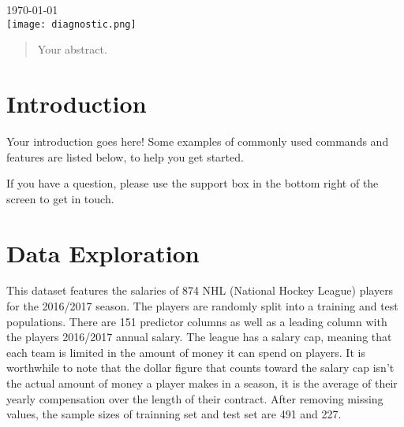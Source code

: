 \begin{titlepage}

{\large \today}\\[2cm] %


\texttt{[image: diagnostic.png]}\\[1cm] %
 

\vfill %

\end{titlepage}


\begin{abstract}
Your abstract.
\end{abstract}

\section{Introduction}

Your introduction goes here! Some examples of commonly used commands and features are listed below, to help you get started.

If you have a question, please use the support box in the bottom right of the screen to get in touch. 

\section{Data Exploration}
This dataset features the salaries of 874 NHL (National Hockey League) players for the 2016/2017 season. The players are randomly split into a training and test populations. There are 151 predictor columns as well as a leading column with the players 2016/2017 annual salary. The league has a salary cap, meaning that each team is limited in the amount of money it can spend on players. It is worthwhile to note that the dollar figure that counts toward the salary cap isn't the actual amount of money a player makes in a season, it is the average of their yearly compensation over the length of their contract. After removing missing values, the sample sizes of trainning set and test set are 491 and 227.

